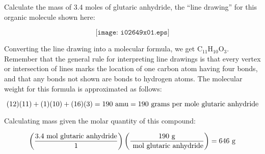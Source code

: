 

Calculate the mass of 3.4 moles of glutaric anhydride, the ``line drawing'' for this organic molecule shown here:

$$\texttt{[image: i02649x01.eps]}$$







Converting the line drawing into a molecular formula, we get C$_{11}$H$_{10}$O$_{3}$.  Remember that the general rule for interpreting line drawings is that every vertex or intersection of lines marks the location of one carbon atom having four bonds, and that any bonds not shown are bonds to hydrogen atoms.  The molecular weight for this formula is approximated as follows:

$$(12)(11) + (1)(10) + (16)(3) = 190 \hbox{ amu} = 190 \hbox{ grams per mole glutaric anhydride}$$

\vskip 10pt

Calculating mass given the molar quantity of this compound:

$$\left(3.4 \hbox{ mol glutaric anhydride} \over 1 \right) \left(190 \hbox{ g} \over \hbox{ mol glutaric anhydride}\right) = 646 \hbox{ g}$$












